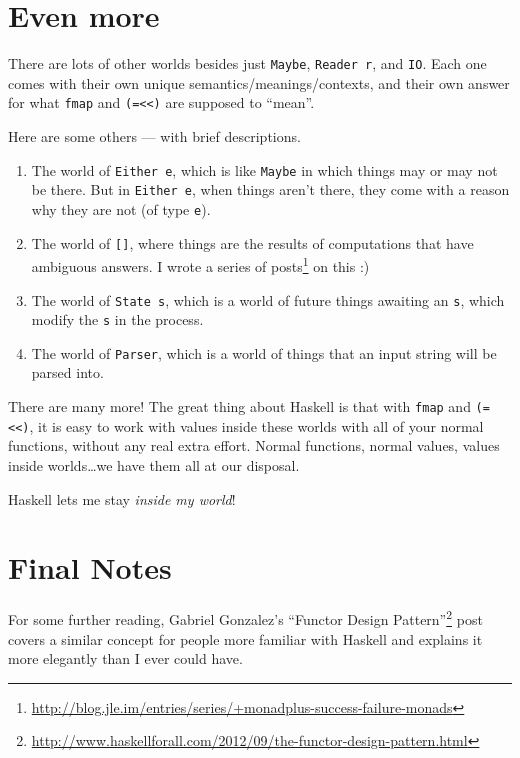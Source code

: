 \documentclass[]{article}
\renewcommand{\href}[2]{#2\footnote{\url{#1}}}
\begin{document}
\section{Even more}\label{even-more}

There are lots of other worlds besides just \texttt{Maybe}, \texttt{Reader\ r},
and \texttt{IO}. Each one comes with their own unique
semantics/meanings/contexts, and their own answer for what \texttt{fmap} and
\texttt{(=\textless{}\textless{})} are supposed to ``mean''.

Here are some others --- with brief descriptions.

\begin{enumerate}
\def\labelenumi{\arabic{enumi}.}
\item
  The world of \texttt{Either\ e}, which is like \texttt{Maybe} in which things
  may or may not be there. But in \texttt{Either\ e}, when things aren't there,
  they come with a reason why they are not (of type \texttt{e}).
\item
  The world of \texttt{{[}{]}}, where things are the results of computations
  that have ambiguous answers. I wrote a
  \href{http://blog.jle.im/entries/series/+monadplus-success-failure-monads}{series
  of posts} on this :)
\item
  The world of \texttt{State\ s}, which is a world of future things awaiting an
  \texttt{s}, which modify the \texttt{s} in the process.
\item
  The world of \texttt{Parser}, which is a world of things that an input string
  will be parsed into.
\end{enumerate}

There are many more! The great thing about Haskell is that with \texttt{fmap}
and \texttt{(=\textless{}\textless{})}, it is easy to work with values inside
these worlds with all of your normal functions, without any real extra effort.
Normal functions, normal values, values inside worlds\ldots we have them all at
our disposal.

Haskell lets me stay \emph{inside my world}!

\section{Final Notes}\label{final-notes}

For some further reading, Gabriel Gonzalez's
\href{http://www.haskellforall.com/2012/09/the-functor-design-pattern.html}{``Functor
Design Pattern''} post covers a similar concept for people more familiar with
Haskell and explains it more elegantly than I ever could have.
\end{document}

